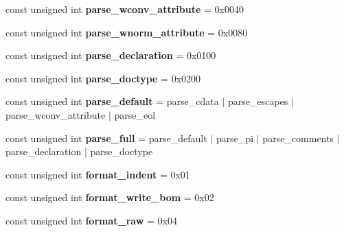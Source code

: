 \begin{DoxyCompactItemize}
\item 
\hypertarget{namespacephys_1_1xml_a3fc1010f3ede7aae963bf0e23b10b3ae}{
const unsigned int {\bfseries parse\_\-wconv\_\-attribute} = 0x0040}
\label{d9/d27/namespacephys_1_1xml_a3fc1010f3ede7aae963bf0e23b10b3ae}

\item 
\hypertarget{namespacephys_1_1xml_afd07ef0583e306ab76620327ae52e27d}{
const unsigned int {\bfseries parse\_\-wnorm\_\-attribute} = 0x0080}
\label{d9/d27/namespacephys_1_1xml_afd07ef0583e306ab76620327ae52e27d}

\item 
\hypertarget{namespacephys_1_1xml_ac2843cd7714bca69663866319949b3a3}{
const unsigned int {\bfseries parse\_\-declaration} = 0x0100}
\label{d9/d27/namespacephys_1_1xml_ac2843cd7714bca69663866319949b3a3}

\item 
\hypertarget{namespacephys_1_1xml_a67cc3ab7951cf52f01def23202be5c65}{
const unsigned int {\bfseries parse\_\-doctype} = 0x0200}
\label{d9/d27/namespacephys_1_1xml_a67cc3ab7951cf52f01def23202be5c65}

\item 
\hypertarget{namespacephys_1_1xml_a3577ef966e9065bd045078a0c5043810}{
const unsigned int {\bfseries parse\_\-default} = parse\_\-cdata $|$ parse\_\-escapes $|$ parse\_\-wconv\_\-attribute $|$ parse\_\-eol}
\label{d9/d27/namespacephys_1_1xml_a3577ef966e9065bd045078a0c5043810}

\item 
\hypertarget{namespacephys_1_1xml_aaba58896bffc421dc0db032c7eabdb8d}{
const unsigned int {\bfseries parse\_\-full} = parse\_\-default $|$ parse\_\-pi $|$ parse\_\-comments $|$ parse\_\-declaration $|$ parse\_\-doctype}
\label{d9/d27/namespacephys_1_1xml_aaba58896bffc421dc0db032c7eabdb8d}

\item 
\hypertarget{namespacephys_1_1xml_a643d303936cdd3d4d5b95fa4b2705a2a}{
const unsigned int {\bfseries format\_\-indent} = 0x01}
\label{d9/d27/namespacephys_1_1xml_a643d303936cdd3d4d5b95fa4b2705a2a}

\item 
\hypertarget{namespacephys_1_1xml_a6a123ecad19078afaa10b47459c12720}{
const unsigned int {\bfseries format\_\-write\_\-bom} = 0x02}
\label{d9/d27/namespacephys_1_1xml_a6a123ecad19078afaa10b47459c12720}

\item 
\hypertarget{namespacephys_1_1xml_a2f8b589f26166c8e744e26a208a4aa81}{
const unsigned int {\bfseries format\_\-raw} = 0x04}
\label{d9/d27/namespacephys_1_1xml_a2f8b589f26166c8e744e26a208a4aa81}


\end{DoxyCompactItemize}

